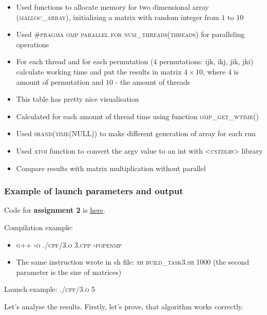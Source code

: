 \documentclass[%
12pt, %
final, %
oneside, %
onecolumn, %
centertags]{article} %
\theoremstyle{plain}
\theoremstyle{definition}
\theoremstyle{remark}
\begin{document}
\begin{itemize}
	\item Used functions to allocate memory for two dimensional array (\textsc{malloc\_array}), initializing a matrix with random integer from $1$ to $10$
	\item Used \textsc{\#pragma omp parallel for num\_threads(threads)} for paralleling operations
	\item For each thread and for each permutation ($4$ permutations: ijk, ikj, jik, jki) calculate working time and put the results in matrix $4 \times 10$, where $4$ is amount of permutation and $10$ - the amount of threads
	\item This table has pretty nice visualisation
	\item Calculated for each amount of thread time using function \textsc{omp\_get\_wtime()}
	\item Used \textsc{srand(time(NULL))} to make different generation of array for each run
	\item Used \textsc{atoi} function to convert the argv value to an int with \textsc{<cstdlib>} library
	\item Compare results with matrix multiplication without parallel
\end{itemize}

\subsubsection{Example of launch parameters and output}

Code for \textbf{assignment 2} is \href{https:\//github.com/aptmess/parallel_algorithms/blob/master/HT/hw_openmp/prog/3.cpp}{here}.

Compilation example: 

\begin{itemize}
	\item \textsc{g++ -o ./cpf/3.o 3.cpp -fopenmp}
	\item The same instruction wrote in sh file: \textsc{sh build\_task3.sh 1000} (the second parameter is the size of matrices)
\end{itemize}

Launch example: \textsc{./cpf/3.o 5}

Let's analyse the results. Firstly, let's prove, that algorithm works correctly.
\end{document}
